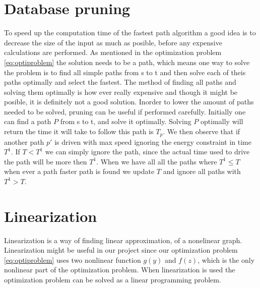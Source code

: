 \section{Database pruning}
To speed up the computation time of the fastest path algorithm a good idea is to decrease the size of the input as much as posible, before any expensive calculations are performed. As mentioned in the optimization problem \ref{eq:optiproblem} the solution needs to be a path, which means one way to solve the problem is to find all simple paths from s to t and then solve each of theis paths optimally and select the fastest. The method of finding all paths and solving them optimally is how ever really expensive and though it might be posible, it is definitely not a good solution. Inorder to lower the amount of paths needed to be solved, pruning can be useful if performed carefully.  
Initially one can find a path $P$ from s to t, and solve it optimally. Solving 
$P$ optimally will return the time it will take to follow this path is $T_p$. We then 
observe that if another path $p'$ is driven with max speed ignoring the energy constraint in time $T^1$. If $T < T^1$ we can simply ignore the path, since the actual time used to drive the path will be more then $T^1$.
When we have all all the paths where $T^1 \leq T$ when ever a path faster path is found 
we update $T$ and ignore all paths with $T^1 > T$. 

\section{Linearization}
Linearization is a way of finding linear approximation, of a nonelinear graph. Linearization might be useful in our project since our optimization problem \ref{eq:optiproblem} uses two nonlinear function $g(y)$ and $f(z)$, which is the only nonlinear part of the optimization problem. When linearization is used the optimization problem can be solved as a linear programming problem. 